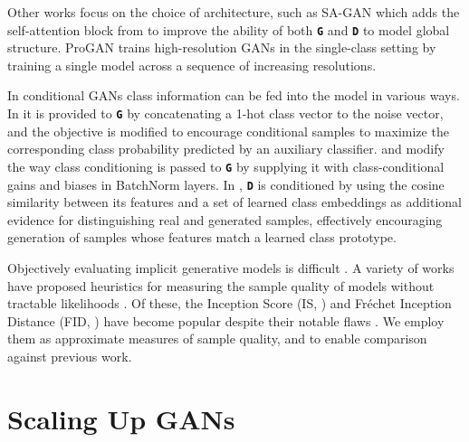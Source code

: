 \documentclass{article} %
\newcommand{\gen}{\textbf{\texttt{G}}}
\newcommand{\discr}{\textbf{\texttt{D}}}
\begin{document}
Other works focus on the choice of architecture, such as SA-GAN \citep{zhang2018sagan} which adds the self-attention block from \citep{wang2018nonlocal} to improve the ability of both \gen{} and \discr{} to model global structure. ProGAN \citep{karras2018progan} trains high-resolution GANs in the single-class setting by training a single model across a sequence of increasing resolutions.

In conditional GANs \citep{mirza2014conditional} class information can be fed into the model in various ways.
In \citep{odena2017acgan} it is provided to \gen{} by concatenating a 1-hot class vector to the noise vector, and the objective is modified to encourage conditional samples to maximize the corresponding class probability predicted by an auxiliary classifier. \citet{devries2017modulating} and \citet{dumoulin2017artistic} modify the way class conditioning is passed to \gen{} by supplying it with class-conditional gains and biases in BatchNorm \citep{ioffe2015batchnorm} layers. In \cite{miyato2018cgans}, \discr{} is conditioned by using the cosine similarity between its features and a set of learned class embeddings as additional evidence for distinguishing real and generated samples, effectively encouraging generation of samples whose features match a learned class prototype.


Objectively evaluating implicit generative models is difficult \citep{theis2015note}. A variety of works have proposed heuristics for measuring the sample quality of models without tractable likelihoods \citep{salimans2016improved, heusel2017ttur, bińkowski2018demystifying, wu2017ais}. Of these, the Inception Score (IS, \citet{salimans2016improved}) and Fr\'echet Inception Distance (FID, \citet{heusel2017ttur}) have become popular despite their 
notable flaws \citep{barratt2018note}. We employ them as approximate measures of sample quality, and to enable comparison against previous work.



\section{Scaling Up GANs}

\end{document}
